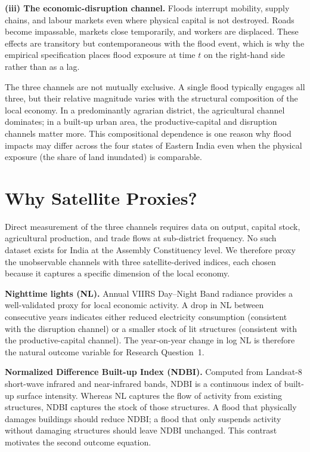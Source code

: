 \documentclass[12pt,a4paper,oneside]{report}
\begin{document}
\textbf{(iii) The economic-disruption channel.} Floods interrupt mobility, supply chains, and labour markets even where physical capital is not destroyed. Roads become impassable, markets close temporarily, and workers are displaced. These effects are transitory but contemporaneous with the flood event, which is why the empirical specification places flood exposure at time $t$ on the right-hand side rather than as a lag.

The three channels are not mutually exclusive. A single flood typically engages all three, but their relative magnitude varies with the structural composition of the local economy. In a predominantly agrarian district, the agricultural channel dominates; in a built-up urban area, the productive-capital and disruption channels matter more. This compositional dependence is one reason why flood impacts may differ across the four states of Eastern India even when the physical exposure (the share of land inundated) is comparable.

\section{Why Satellite Proxies?}
Direct measurement of the three channels requires data on output, capital stock, agricultural production, and trade flows at sub-district frequency. No such dataset exists for India at the Assembly Constituency level. We therefore proxy the unobservable channels with three satellite-derived indices, each chosen because it captures a specific dimension of the local economy.

\textbf{Nighttime lights (NL).} Annual VIIRS Day--Night Band radiance provides a well-validated proxy for local economic activity. A drop in NL between consecutive years indicates either reduced electricity consumption (consistent with the disruption channel) or a smaller stock of lit structures (consistent with the productive-capital channel). The year-on-year change in log NL is therefore the natural outcome variable for Research Question~1.

\textbf{Normalized Difference Built-up Index (NDBI).} Computed from Landsat-8 short-wave infrared and near-infrared bands, NDBI is a continuous index of built-up surface intensity. Whereas NL captures the flow of activity from existing structures, NDBI captures the stock of those structures. A flood that physically damages buildings should reduce NDBI; a flood that only suspends activity without damaging structures should leave NDBI unchanged. This contrast motivates the second outcome equation.
\end{document}
